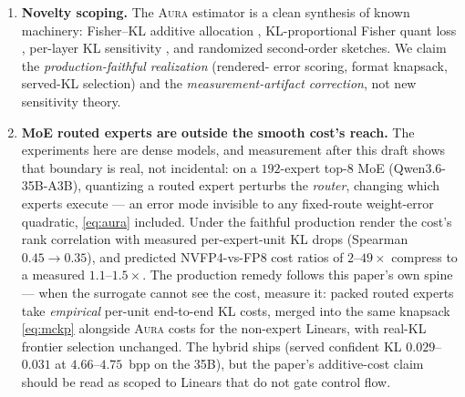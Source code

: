 \documentclass[11pt]{article}
\theoremstyle{plain}
\theoremstyle{definition}
\begin{document}
\begin{enumerate}[leftmargin=*,itemsep=3pt]
    27B repeat would strengthen the retirement further; on the present evidence the
    $L_2$ cross-layer cost adds only $1.5\%$ over $L_1$.
  \item \textbf{Novelty scoping.} The \textsc{Aura} estimator is a clean
    synthesis of known machinery: Fisher--KL additive allocation
    \cite{orr2025}, KL-proportional Fisher quant loss \cite{fimaq2025},
    per-layer KL sensitivity \cite{kllens2026}, and randomized second-order
    sketches. We claim the \emph{production-faithful realization} (rendered-%
    error scoring, format knapsack, served-KL selection) and the
    \emph{measurement-artifact correction}, not new sensitivity theory.
  \item \textbf{MoE routed experts are outside the smooth cost's reach.} The
    experiments here are dense models, and measurement after this draft shows
    that boundary is real, not incidental: on a $192$-expert top-$8$ MoE
    (Qwen3.6-35B-A3B), quantizing a routed expert perturbs the \emph{router},
    changing which experts execute --- an error mode invisible to any
    fixed-route weight-error quadratic, \eqref{eq:aura} included. Under the
    faithful production render the cost's rank correlation with measured
    per-expert-unit KL drops (Spearman $0.45\!\to\!0.35$), and predicted
    NVFP4-vs-FP8 cost ratios of $2$--$49\times$ compress to a measured
    $1.1$--$1.5\times$. The production remedy follows this paper's own spine
    --- when the surrogate cannot see the cost, measure it: packed routed
    experts take \emph{empirical} per-unit end-to-end KL costs, merged into the
    same knapsack \eqref{eq:mckp} alongside \textsc{Aura} costs for the
    non-expert Linears, with real-KL frontier selection unchanged. The hybrid
    ships (served confident KL $0.029$--$0.031$ at $4.66$--$4.75$~bpp on the
    35B), but the paper's additive-cost claim should be read as scoped to
    Linears that do not gate control flow.
\end{enumerate}
\end{document}

